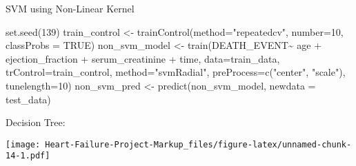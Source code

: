 \documentclass[
]{article}
\newenvironment{Shaded}{\begin{snugshade}}{\end{snugshade}}
\newcommand{\AttributeTok}[1]{\textcolor[rgb]{0.77,0.63,0.00}{#1}}
\newcommand{\ConstantTok}[1]{\textcolor[rgb]{0.00,0.00,0.00}{#1}}
\newcommand{\DecValTok}[1]{\textcolor[rgb]{0.00,0.00,0.81}{#1}}
\newcommand{\FunctionTok}[1]{\textcolor[rgb]{0.00,0.00,0.00}{#1}}
\newcommand{\NormalTok}[1]{#1}
\newcommand{\OtherTok}[1]{\textcolor[rgb]{0.56,0.35,0.01}{#1}}
\newcommand{\SpecialCharTok}[1]{\textcolor[rgb]{0.00,0.00,0.00}{#1}}
\newcommand{\StringTok}[1]{\textcolor[rgb]{0.31,0.60,0.02}{#1}}
\begin{document}
SVM using Non-Linear Kernel

\begin{Shaded}
\begin{Highlighting}[]
\FunctionTok{set.seed}\NormalTok{(}\DecValTok{139}\NormalTok{)}
\NormalTok{train\_control }\OtherTok{\textless{}{-}} \FunctionTok{trainControl}\NormalTok{(}\AttributeTok{method=}\StringTok{"repeatedcv"}\NormalTok{, }\AttributeTok{number=}\DecValTok{10}\NormalTok{, }\AttributeTok{classProbs =}  \ConstantTok{TRUE}\NormalTok{)}
\NormalTok{non\_svm\_model }\OtherTok{\textless{}{-}} \FunctionTok{train}\NormalTok{(DEATH\_EVENT}\SpecialCharTok{\textasciitilde{}}\NormalTok{ age }\SpecialCharTok{+}\NormalTok{ ejection\_fraction }\SpecialCharTok{+}\NormalTok{ serum\_creatinine }\SpecialCharTok{+}\NormalTok{ time, }\AttributeTok{data=}\NormalTok{train\_data, }\AttributeTok{trControl=}\NormalTok{train\_control, }\AttributeTok{method=}\StringTok{"svmRadial"}\NormalTok{, }\AttributeTok{preProcess=}\FunctionTok{c}\NormalTok{(}\StringTok{"center"}\NormalTok{, }\StringTok{"scale"}\NormalTok{), }\AttributeTok{tunelength=}\DecValTok{10}\NormalTok{)}
\NormalTok{non\_svm\_pred }\OtherTok{\textless{}{-}} \FunctionTok{predict}\NormalTok{(non\_svm\_model, }\AttributeTok{newdata =}\NormalTok{ test\_data)}
\end{Highlighting}
\end{Shaded}

Decision Tree:

\begin{Shaded}
\end{Shaded}

\texttt{[image: Heart-Failure-Project-Markup\_files/figure-latex/unnamed-chunk-14-1.pdf]}
\end{document}
